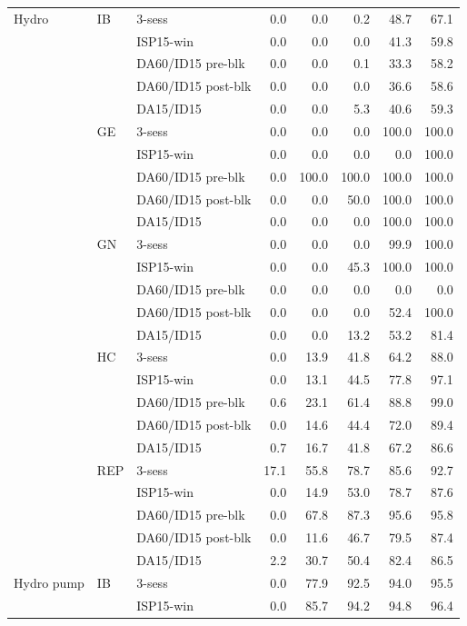 \begin{tabular}{l l l r r r r r}
\addlinespace
Hydro & IB & 3-sess & 0.0 & 0.0 & 0.2 & 48.7 & 67.1 \\
 &  & ISP15-win & 0.0 & 0.0 & 0.0 & 41.3 & 59.8 \\
 &  & DA60/ID15 pre-blk & 0.0 & 0.0 & 0.1 & 33.3 & 58.2 \\
 &  & DA60/ID15 post-blk & 0.0 & 0.0 & 0.0 & 36.6 & 58.6 \\
 &  & DA15/ID15 & 0.0 & 0.0 & 5.3 & 40.6 & 59.3 \\
 & GE & 3-sess & 0.0 & 0.0 & 0.0 & 100.0 & 100.0 \\
 &  & ISP15-win & 0.0 & 0.0 & 0.0 & 0.0 & 100.0 \\
 &  & DA60/ID15 pre-blk & 0.0 & 100.0 & 100.0 & 100.0 & 100.0 \\
 &  & DA60/ID15 post-blk & 0.0 & 0.0 & 50.0 & 100.0 & 100.0 \\
 &  & DA15/ID15 & 0.0 & 0.0 & 0.0 & 100.0 & 100.0 \\
 & GN & 3-sess & 0.0 & 0.0 & 0.0 & 99.9 & 100.0 \\
 &  & ISP15-win & 0.0 & 0.0 & 45.3 & 100.0 & 100.0 \\
 &  & DA60/ID15 pre-blk & 0.0 & 0.0 & 0.0 & 0.0 & 0.0 \\
 &  & DA60/ID15 post-blk & 0.0 & 0.0 & 0.0 & 52.4 & 100.0 \\
 &  & DA15/ID15 & 0.0 & 0.0 & 13.2 & 53.2 & 81.4 \\
 & HC & 3-sess & 0.0 & 13.9 & 41.8 & 64.2 & 88.0 \\
 &  & ISP15-win & 0.0 & 13.1 & 44.5 & 77.8 & 97.1 \\
 &  & DA60/ID15 pre-blk & 0.6 & 23.1 & 61.4 & 88.8 & 99.0 \\
 &  & DA60/ID15 post-blk & 0.0 & 14.6 & 44.4 & 72.0 & 89.4 \\
 &  & DA15/ID15 & 0.7 & 16.7 & 41.8 & 67.2 & 86.6 \\
 & REP & 3-sess & 17.1 & 55.8 & 78.7 & 85.6 & 92.7 \\
 &  & ISP15-win & 0.0 & 14.9 & 53.0 & 78.7 & 87.6 \\
 &  & DA60/ID15 pre-blk & 0.0 & 67.8 & 87.3 & 95.6 & 95.8 \\
 &  & DA60/ID15 post-blk & 0.0 & 11.6 & 46.7 & 79.5 & 87.4 \\
 &  & DA15/ID15 & 2.2 & 30.7 & 50.4 & 82.4 & 86.5 \\
\addlinespace
Hydro pump & IB & 3-sess & 0.0 & 77.9 & 92.5 & 94.0 & 95.5 \\
 &  & ISP15-win & 0.0 & 85.7 & 94.2 & 94.8 & 96.4 \\

\end{tabular}
